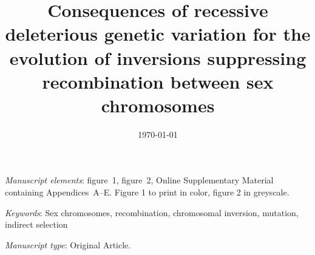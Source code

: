 \documentclass[11pt]{article}
\begin{document}
\title{Consequences of recessive deleterious genetic variation for the evolution of inversions suppressing recombination between sex chromosomes}


\date{\today}
\maketitle




\bigskip

\noindent \textit{Manuscript elements}: figure~1, figure~2, Online Supplementary Material containing Appendices~A--E. Figure 1 to print in color, figure 2 in greyscale.

\bigskip

\noindent \textit{Keywords}: Sex chromosomes, recombination, chromosomal inversion, mutation, indirect selection 

\bigskip

\noindent \textit{Manuscript type}: Original Article. %

\bigskip



\bigskip

\end{document}
